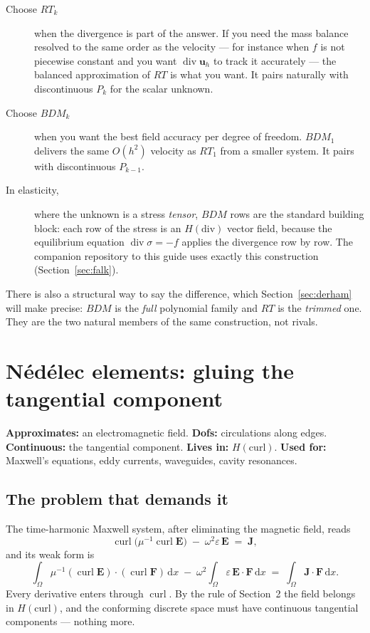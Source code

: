 \documentclass[11pt,a4paper]{article}
\newcommand{\Hdiv}{H(\mathrm{div})}
\newcommand{\Hcurl}{H(\mathrm{curl})}
\newcommand{\dv}{\operatorname{div}}
\newcommand{\curl}{\operatorname{curl}}
\newcommand{\dx}{\,\mathrm{d}x}
\newcommand{\bu}{\mathbf{u}}
\newcommand{\bE}{\mathbf{E}}
\begin{document}
\begin{description}
\item[Choose $RT_k$] when the divergence is part of the answer. If you need the
  mass balance resolved to the same order as the velocity --- for instance when
  $f$ is not piecewise constant and you want $\dv \bu_h$ to track it
  accurately --- the balanced approximation of $RT$ is what you want. It pairs
  naturally with discontinuous $P_k$ for the scalar unknown.
\item[Choose $BDM_k$] when you want the best field accuracy per degree of
  freedom. $BDM_1$ delivers the same $O(h^2)$ velocity as $RT_1$ from a smaller
  system. It pairs with discontinuous $P_{k-1}$.
\item[In elasticity,] where the unknown is a stress \emph{tensor}, $BDM$ rows
  are the standard building block: each row of the stress is an $\Hdiv$ vector
  field, because the equilibrium equation $\dv\sigma = -f$ applies the
  divergence row by row. The companion repository to this guide uses exactly
  this construction (Section~\ref{sec:falk}).
\end{description}

There is also a structural way to say the difference, which
Section~\ref{sec:derham} will make precise: $BDM$ is the \emph{full} polynomial
family and $RT$ is the \emph{trimmed} one. They are the two natural members of
the same construction, not rivals.

\FloatBarrier

\section{Nédélec elements: gluing the tangential component}
\label{sec:nedelec}

\begin{keypoint}[cHcurl]
\textbf{Approximates:} an electromagnetic field.\quad
\textbf{Dofs:} circulations along edges.\quad
\textbf{Continuous:} the tangential component.\quad
\textbf{Lives in:} $\Hcurl$.\quad
\textbf{Used for:} Maxwell's equations, eddy currents, waveguides, cavity
resonances.
\end{keypoint}

\subsection{The problem that demands it}

The time-harmonic Maxwell system, after eliminating the magnetic field, reads
\[
  \curl\!\big(\mu^{-1} \curl \bE\big) \;-\; \omega^2 \varepsilon\, \bE
  \;=\; \mathbf{J},
\]
and its weak form is
\[
  \int_\Omega \mu^{-1} (\curl \bE)\cdot(\curl \mathbf{F}) \dx
  \;-\; \omega^2 \int_\Omega \varepsilon\, \bE \cdot \mathbf{F} \dx
  \;=\; \int_\Omega \mathbf{J}\cdot\mathbf{F} \dx .
\]
Every derivative enters through $\curl$. By the rule of Section~2 the field
belongs in $\Hcurl$, and the conforming discrete space must have continuous
tangential components --- nothing more.
\end{document}
